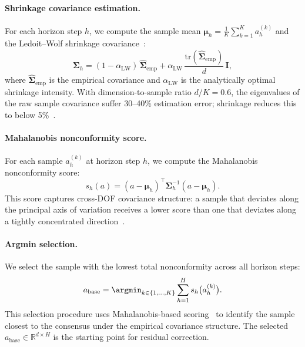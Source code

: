 \paragraph{Shrinkage covariance estimation.}
For each horizon step $h$, we compute the sample mean $\boldsymbol{\mu}_h = \frac{1}{K}\sum_{k=1}^K a_h^{(k)}$ and the Ledoit--Wolf shrinkage covariance~\cite{ledoit2004well}:
\begin{equation}
  \boldsymbol{\Sigma}_h = (1 - \alpha_{\mathrm{LW}})\,\hat{\boldsymbol{\Sigma}}_{\mathrm{emp}} + \alpha_{\mathrm{LW}}\,\frac{\mathrm{tr}(\hat{\boldsymbol{\Sigma}}_{\mathrm{emp}})}{d}\,\mathbf{I},
  \label{eq:shrinkage}
\end{equation}
where $\hat{\boldsymbol{\Sigma}}_{\mathrm{emp}}$ is the empirical covariance and $\alpha_{\mathrm{LW}}$ is the analytically optimal shrinkage intensity. With dimension-to-sample ratio $d/K = 0.6$, the eigenvalues of the raw sample covariance suffer 30--40\% estimation error; shrinkage reduces this to below 5\%~\cite{ledoit2004well}.

\paragraph{Mahalanobis nonconformity score.}
For each sample $a_h^{(k)}$ at horizon step $h$, we compute the Mahalanobis nonconformity score:
\begin{equation}
  s_h(a) = (a - \boldsymbol{\mu}_h)^\top \boldsymbol{\Sigma}_h^{-1} (a - \boldsymbol{\mu}_h).
  \label{eq:mahal}
\end{equation}
This score captures cross-DOF covariance structure: a sample that deviates along the principal axis of variation receives a lower score than one that deviates along a tightly concentrated direction~\cite{braun2025cgs}.

\paragraph{Argmin selection.}
We select the sample with the lowest total nonconformity across all horizon steps:
\begin{equation}
  a_{\mathrm{base}} = \argmin_{k \in \{1,\dots,K\}} \sum_{h=1}^{H} s_h\bigl(a_h^{(k)}\bigr).
  \label{eq:argmin}
\end{equation}
This selection procedure uses Mahalanobis-based scoring~\cite{braun2025cgs} to identify the sample closest to the consensus under the empirical covariance structure. The selected $a_{\mathrm{base}} \in \mathbb{R}^{d \times H}$ is the starting point for residual correction.

